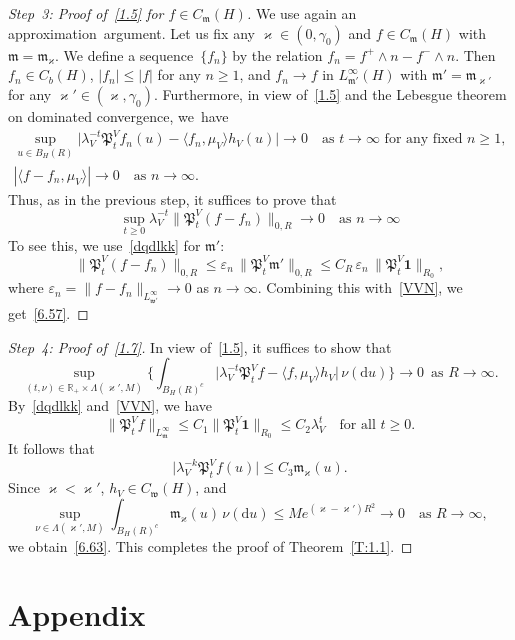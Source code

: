 \documentclass[10pt]{amsart}
\theoremstyle{definition}\newtheorem{defi}[theo]{Definition}\newtheorem{rema}[theo]{Remark}\newtheorem{exam}[theo]{Example}\newtheorem{exem}[theo]{Example}\newtheorem{nota}[theo]{Notation}
\newcommand{\e}{\varepsilon}
\newcommand{\mek}{{\mathbf 1}}
\newcommand{\R}{{\mathbb R}}
\newcommand{\vk}{{\varkappa}}
\newcommand{\wwww}{{\mathfrak w}}
\newcommand{\mm}{{\mathfrak m}}
\newcommand{\PPPP}{{\mathfrak P}}
\newcommand{\dd}{\mathrm{d}}
\newenvironment{step}{\begin{proof}}{\let\qed\relax \end{proof}}
\begin{document}
\begin{step}[Step~3: Proof of~\eqref{1.5} for $f\in C_\mm(H)$]
We use again an approximation~argument. Let us fix any $\vk\in(0,\gamma_0)$ and $f\in C_{\mm}(H)$ with $\mm=\mm_\vk$. We define a sequence~$\{f_n\}$ by the relation $f_n=f^+\wedge n-f^-\wedge n$. Then $f_n\in C_b(H)$, $|f_n|\le |f|$ for any $n\ge1$, and $f_n\to f$ in $L_{\mm'}^\infty(H)$ with $\mm'=\mm_{\vk'}$ for any $\vk'\in(\vk,\gamma_0)$. Furthermore, in view of~\eqref{1.5} and the Lebesgue theorem on dominated convergence, we~have
\begin{gather*}
\sup_{u\in B_H(R)}\bigl|\lambda_V^{-t}\PPPP_t^Vf_n(u)-\langle f_n,\mu_V\rangle h_V(u)\bigr| \to0\quad\mbox{as $t\to\infty$ for any fixed $n\ge1$},\\
|\langle f-f_n,\mu_V\rangle|\to0\quad\mbox{as $n\to\infty$}.
\end{gather*}
Thus, as in the previous step, it suffices to prove that
\begin{equation}\label{6.57}
\sup_{t\ge 0}\lambda_V^{-t}\|\PPPP_t^V(f-f_n)\|_{0,R}\to0\quad\mbox{as $n\to\infty$}
\end{equation}
To see this, we use~\eqref{dqdlkk} for $\mm'$:
\[
\|\PPPP_t^V(f-f_n)\|_{0,R}\le \e_n\,\|\PPPP_t^V\mm'\|_{0,R}
\le C_R\,\e_n\, \|\PPPP_t^V{\mek}\|_{R_0},
\]
where $\e_n=\|f-f_n\|_{L_{\wwww'}^\infty}\to0$ as $n\to\infty$. Combining this with~\eqref{VVN}, we get~\eqref{6.57}.
\end{step}

\begin{step}[Step~4: Proof of~\eqref{1.7}]
In view of~\eqref{1.5}, it suffices to show that
\begin{equation}\label{6.63}
\sup_{(t, \nu)\in\R_+\times\Lambda({\vk'},M)}\biggl\{\int_{B_H(R)^c}\bigl|\lambda_V^{-t}\PPPP_t^Vf-\langle f,\mu_V\rangle h_V\bigr|\,\nu(\dd u) \biggr\}\to0\,\,\,
\mbox{as $R\to\infty$}.
\end{equation}
By~\eqref{dqdlkk} and~\eqref{VVN}, we have
\[
\|\PPPP_t^Vf\|_{L_\mm^\infty}\le C_1\|\PPPP_t^V{\mek}\|_{R_0}\le C_2\lambda_V^t\quad\mbox{for all $t\ge0$}.
\]
It follows that
\[
\bigl|\lambda_V^{-k}\PPPP_t^Vf(u)\bigr|\le C_3\mm_\vk(u).
\]
Since $ \vk< \vk'$, $h_V\in C_\wwww(H)$, and
\[
\sup_{\nu\in\Lambda(\vk',M)}\int_{B_H(R)^c} \mm_\vk(u)\,\nu(\dd u)\le M e^{(\vk-\vk')R^2}\to0\quad\mbox{as $R\to\infty$},
\]
we obtain~\eqref{6.63}. This completes the proof of Theorem~\ref{T:1.1}.
\end{step}


\section{Appendix}\label{S:5}
\end{document}
